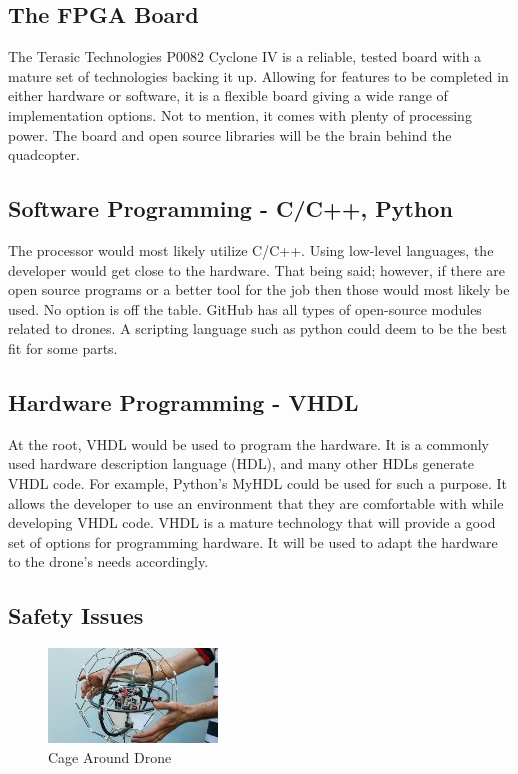 \documentclass[a4paper, 11pt]{article} %
\begin{document}
\subsection{The FPGA Board}

The Terasic Technologies P0082 Cyclone IV is a reliable, tested board with a mature set of technologies backing it up. Allowing for features to be completed in either hardware or software, it is a flexible board giving a wide range of implementation options. Not to mention, it comes with plenty of processing power. \cite{Board} The board and open source libraries will be the brain behind the quadcopter. \cite{DIY} 

\subsection{Software Programming - C/C++, Python}

The processor would most likely utilize C/C++. Using low-level languages, the developer would get close to the hardware. That being said; however, if there are open source programs or a better tool for the job then those would most likely be used. No option is off the table. GitHub has all types of open-source modules related to drones. A scripting language such as python could deem to be the best fit for some parts.

\subsection{Hardware Programming - VHDL}

At the root, VHDL would be used to program the hardware. It is a commonly used hardware description language (HDL), and many other HDLs generate VHDL code. For example, Python's MyHDL could be used for such a purpose. It allows the developer to use an environment that they are comfortable with while developing VHDL code. VHDL is a mature technology that will provide a good set of options for programming hardware. It will be used to adapt the hardware to the drone's needs accordingly.

\subsection{Safety Issues}

\begin{figure} %
\begin{center}
\includegraphics[width=0.40\textwidth]{cage.jpeg}
\caption{Cage Around Drone \cite{Drone}}
\end{center}
\end{figure}
\end{document}
